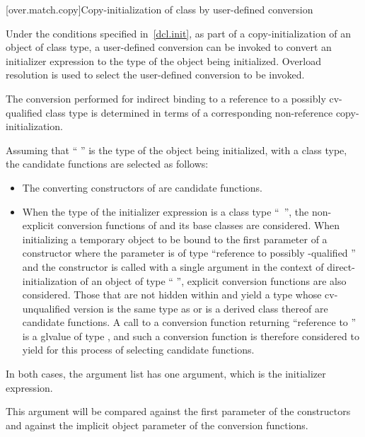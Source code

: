 [over.match.copy]{Copy-initialization of class by user-defined conversion}%

\pnum
Under the conditions specified in~\ref{dcl.init}, as
part of a copy-initialization of an object of class type, a user-defined
conversion can be invoked to convert an initializer expression to the
type of the object being initialized.
Overload resolution is used
to select the user-defined conversion to be invoked.
\begin{note} The conversion performed for indirect binding to a reference to a possibly
cv-qualified class type is determined in terms of a corresponding non-reference
copy-initialization. \end{note}
Assuming that
`` '' is the type of the object being initialized, with
a class type,
the candidate functions are selected as follows:

\begin{itemize}
\item
The converting constructors of
are candidate functions.
\item
When the type of the initializer expression is a class type
``\cv{}~'',
the non-explicit conversion functions of
and its base classes are considered.
When initializing a temporary object
to be bound to the first parameter of a constructor
where the parameter is of type
``reference to possibly \cv-qualified ''
and the constructor is
called with a single argument in the context of
direct-initialization of an object of type `` '', explicit
conversion functions are also considered.
Those that are not hidden within
and yield a type whose cv-unqualified version is the same type as
or is a derived class thereof
are candidate functions.
A call to a conversion function returning ``reference to ''
is a glvalue of type , and such a conversion function is
therefore considered to yield  for this process of selecting
candidate functions.
\end{itemize}

\pnum
In both cases, the argument list has one argument, which is the initializer
expression.
\begin{note}
This argument will be compared against
the first parameter of the constructors and against the implicit
object parameter of the conversion functions.
\end{note}


